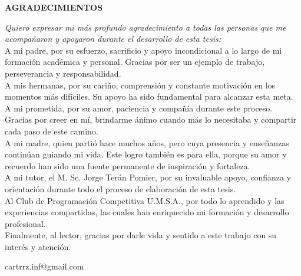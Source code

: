 \clearpage



\begin{flushleft}
\begin{center}
  \textbf{AGRADECIMIENTOS}
\end{center}

\textit{Quiero expresar mi más profundo agradecimiento a todas las personas que me acompañaron y apoyaron durante el desarrollo de esta tesis:}\\

A mi padre, por su esfuerzo, sacrificio y apoyo incondicional a lo largo de mi formación académica y personal. Gracias por ser un ejemplo de trabajo, perseverancia y responsabilidad.\\

A mis hermanas, por su cariño, comprensión y constante motivación en los momentos más difíciles. Su apoyo ha sido fundamental para alcanzar esta meta.\\

A mi prometida, por su amor, paciencia y compañía durante este proceso. Gracias por creer en mí, brindarme ánimo cuando más lo necesitaba y compartir cada paso de este camino.\\

A mi madre, quien partió hace muchos años, pero cuya presencia y enseñanzas continúan guiando mi vida. Este logro también es para ella, porque su amor y recuerdo han sido una fuente permanente de inspiración y fortaleza.\\

A mi tutor, el M. Sc. Jorge Terán Pomier, por su invaluable apoyo, confianza y orientación durante todo el proceso de elaboración de esta tesis. \\

Al Club de Programación Competitiva U.M.S.A., por todo lo aprendido y las experiencias compartidas, las cuales han enriquecido mi formación y desarrollo profesional. \\

Finalmente, al lector, gracias por darle vida y sentido a este trabajo con su interés y atención. \\
\end{flushleft}

\vspace{\fill}
\begin{flushright}
  cartrrz.inf@gmail.com
\end{flushright}

